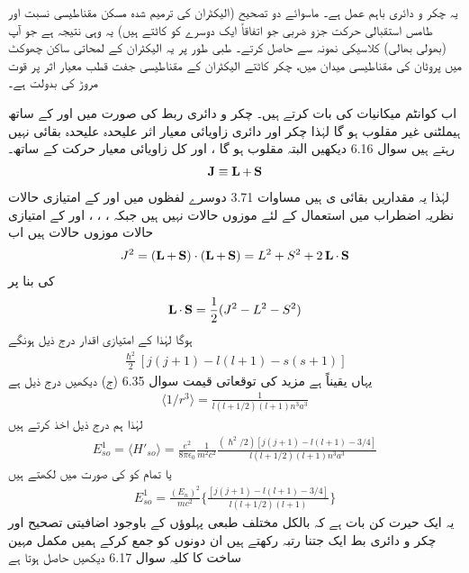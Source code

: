 یہ چکر و دائری  باہم عمل ہے۔ ماسوائے دو تصحیح (الیکٹران کی ترمیم شدہ مسکن مقناطیسی نسبت  اور طامس استقبالی حرکت جزو ضربی جو اتفاقاً ایک دوسرے کو کاٹتے  ہیں)  یہ وہی نتیجہ ہے جو آپ (بھولی بھالی)  کلاسیکی نمونہ سے حاصل کرتے۔ طبی طور پر یہ الیکٹران کے لمحاتی ساکن چھوکٹ  میں پروٹان کی مقناطیسی میدان میں، چکر کاٹتے الیکٹران کے مقناطیسی جفت قطب معیار اثر پر قوت مروڑ کی بدولت ہے۔

 اب کوانٹم میکانیات کی بات کرتے ہیں۔ چکر و دائری ربط کی صورت میں  اور  کے ساتھ ہیملٹنی غیر مقلوب ہو گا لہٰذا چکر اور دائری زاویائی معیار اثر علیحدہ علیحدہ   بقائی  نہیں رہتے ہیں سوال 6.16 دیکھیں البتہ  مقلوب ہو گا ،  اور کل زاویائی معیار حرکت کے ساتھ۔
\begin{align}
\operatorname{\mathbf{J}} \equiv \operatorname{\mathbf{L}} + \operatorname{\mathbf{S}}
\end{align}
 لہٰذا   یہ مقداریں   بقائی ی ہیں مساوات 3.71 دوسرے لفظوں میں  اور  کے امتیازی حالات نظریہ اضطراب میں استعمال کے لئے موزوں حالات نہیں ہیں جبکہ ، ، ، اور  کے امتیازی حالات موزوں حالات ہیں اب 
\begin{align*}
J^2 = (\operatorname{\mathbf{L}} + \operatorname{\mathbf{S}}) \cdot (\operatorname{\mathbf{L}} + \operatorname{\mathbf{S}}) = L^2 + S^2 + 2 \operatorname{\mathbf{L}} \cdot \operatorname{\mathbf{S}}
\end{align*}
کی بنا پر 
\begin{align}
\operatorname{\mathbf{L}} \cdot \operatorname{\mathbf{S}} = \frac{1}{2} (J^2 - L^2 - S^2)
\end{align}
ہوگا  لہٰذا    کے امتیازی اقدار درج ذیل ہونگے 
\begin{align*}
\frac{\hslash^2}{2} [j (j + 1) - l(l + 1) - s(s + 1)]
\end{align*}
یہاں یقیناً  ہے مزید  کی توقعاتی قیمت سوال 6.35 (ج) دیکھیں درج ذیل ہے 
\begin{align}
\langle 1/r^3 \rangle = \frac{1}{l(l + 1/2) (l + 1) n^3 a^3} 
\end{align}
 لہٰذا   ہم درج ذیل اخذ کرتے ہیں 
\begin{align*}
E_{so}^1 = \langle H'_{so} \rangle = \frac{e^2}{8 \pi \epsilon_0} \frac{1}{m^2 c^2} \frac{(\hslash^2 /2) [j(j + 1) - l(l + 1) - 3/4]}{l(l + 1/2)(l + 1)n^3 a^3}
\end{align*} 
یا تمام کو  کی صورت میں لکھتے ہیں 
\begin{align}
E^1_{so} = \frac{(E_n)^2}{mc^2} \big \{ \frac{[j(j + 1) - l(l + 1) - 3/4]}{l(l + 1/2)(l + 1)} \big \}
\end{align}
یہ ایک حیرت کن بات ہے کہ بالکل مختلف طبعی پہلوؤں کے باوجود اضافیتی تصحیح اور چکر و دائری بط ایک جتنا رتبہ  رکھتے ہیں ان دونوں کو جمع کرکے ہمیں مکمل مہین ساخت کا کلیہ سوال 6.17 دیکھیں حاصل ہوتا ہے 
